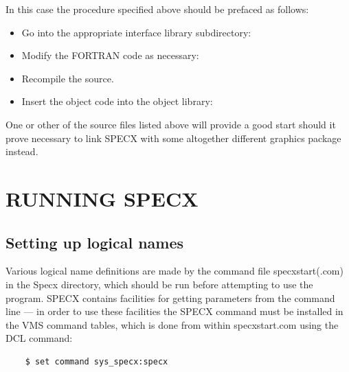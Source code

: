 \documentclass[11pt,twoside]{report}
\begin{document}
In this case the procedure specified above should be prefaced as follows:
\begin{itemize}
\item Go into the appropriate interface library subdirectory: 
\item Modify the FORTRAN code as necessary:
\item Recompile the source.
\item Insert the object code into the object library:
\end{itemize}

One or other of the source files listed above will provide a good
start should it prove necessary to link SPECX with some altogether
different graphics package instead.

\section{RUNNING SPECX}

\subsection{Setting up logical names}

Various logical name definitions are made by the command file
specxstart(.com) in the Specx directory, which
should be run before attempting to use the program. SPECX contains
facilities for getting parameters from the command line --- in order
to use these facilities the SPECX command must be installed in the VMS
command tables, which is done from within
specxstart.com using the DCL command:
\begin{verbatim}
    $ set command sys_specx:specx
\end{verbatim}
\end{document}
